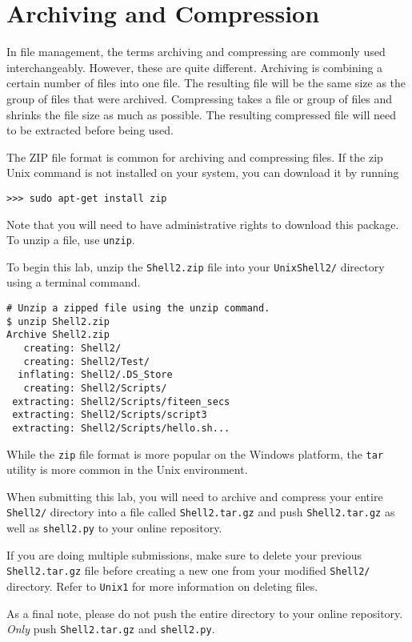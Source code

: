 \labdependencies{}

\section*{Archiving and Compression} %
In file management, the terms archiving and compressing are commonly used interchangeably.
However, these are quite different.
Archiving is combining a certain number of files into one file.
The resulting file will be the same size as the group of files that were archived. 
Compressing takes a file or group of files and shrinks the file size as much as possible. 
The resulting compressed file will need to be extracted before being used.

The ZIP file format is common for archiving and compressing files. 
If the zip Unix command is not installed on your system, you can download it by running 
\begin{lstlisting}
>>> sudo apt-get install zip
\end{lstlisting}
Note that you will need to have administrative rights to download this package. 
To unzip a file, use \texttt{unzip}.

\begin{info}
To begin this lab, unzip the \texttt{Shell2.zip} file into your \texttt{UnixShell2/} directory using a terminal command.
\end{info}

\begin{lstlisting}
# Unzip a zipped file using the unzip command.
$ unzip Shell2.zip
Archive Shell2.zip
   creating: Shell2/
   creating: Shell2/Test/
  inflating: Shell2/.DS_Store        
   creating: Shell2/Scripts/
 extracting: Shell2/Scripts/fiteen_secs  
 extracting: Shell2/Scripts/script3  
 extracting: Shell2/Scripts/hello.sh...
\end{lstlisting}

While the \texttt{zip} file format is more popular on the Windows platform, the \texttt{tar} utility is more
common in the Unix environment.

\begin{info}
When submitting this lab, you will need to archive and compress your entire \texttt{Shell2/} directory into a file called \texttt{Shell2.tar.gz} and push \texttt{Shell2.tar.gz} as well as \texttt{shell2.py} to your online repository.

If you are doing multiple submissions, make sure to delete your previous \texttt{Shell2.tar.gz} file before creating a new one from your modified \texttt{Shell2/} directory.
Refer to \texttt{Unix1} for more information on deleting files.

As a final note, please do not push the entire directory to your online repository.
\emph{Only} push \texttt{Shell2.tar.gz} and \texttt{shell2.py}.
\end{info}

